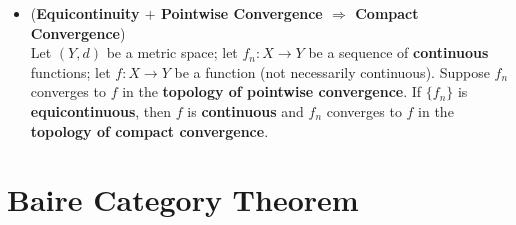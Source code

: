 \documentclass[11pt]{article}
\begin{document}
\begin{itemize}
\item \begin{proposition} (\textbf{Equicontinuity $+$ Pointwise Convergence $\Rightarrow$ Compact Convergence}) \citep{munkres2000topology}\\
Let $(Y, d)$ be a metric space; let $f_n : X \rightarrow Y$ be a sequence of \textbf{continuous} functions; let $f : X \rightarrow Y$ be a function (not necessarily continuous). Suppose $f_n$ converges to $f$ in the \textbf{topology of pointwise convergence}. If $\{f_n\}$ is \textbf{equicontinuous}, then $f$ is \textbf{continuous} and $f_n$ converges to $f$ in the \textbf{topology of compact convergence}.
\end{proposition}
\end{itemize}

\section{Baire Category Theorem}
\end{document}
